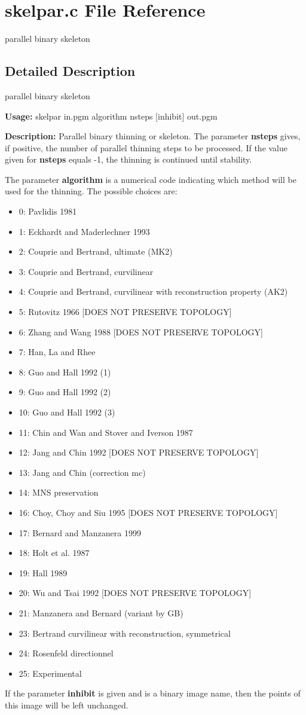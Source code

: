 \section{skelpar.c File Reference}
\label{skelpar_8c}
parallel binary skeleton 



\subsection{Detailed Description}
parallel binary skeleton 

{\bf Usage:} skelpar in.pgm algorithm nsteps [inhibit] out.pgm

{\bf Description:} Parallel binary thinning or skeleton. The parameter {\bf nsteps} gives, if positive, the number of parallel thinning steps to be processed. If the value given for {\bf nsteps} equals -1, the thinning is continued until stability.

The parameter {\bf algorithm} is a numerical code indicating which method will be used for the thinning. The possible choices are: \begin{itemize}
\item 0: Pavlidis 1981 \item 1: Eckhardt and Maderlechner 1993 \item 2: Couprie and Bertrand, ultimate (MK2) \item 3: Couprie and Bertrand, curvilinear \item 4: Couprie and Bertrand, curvilinear with reconstruction property (AK2) \item 5: Rutovitz 1966 [DOES NOT PRESERVE TOPOLOGY] \item 6: Zhang and Wang 1988 [DOES NOT PRESERVE TOPOLOGY] \item 7: Han, La and Rhee \item 8: Guo and Hall 1992 (1) \item 9: Guo and Hall 1992 (2) \item 10: Guo and Hall 1992 (3) \item 11: Chin and Wan and Stover and Iverson 1987 \item 12: Jang and Chin 1992 [DOES NOT PRESERVE TOPOLOGY] \item 13: Jang and Chin (correction mc) \item 14: MNS preservation \item 16: Choy, Choy and Siu 1995 [DOES NOT PRESERVE TOPOLOGY] \item 17: Bernard and Manzanera 1999 \item 18: Holt et al. 1987 \item 19: Hall 1989 \item 20: Wu and Tsai 1992 [DOES NOT PRESERVE TOPOLOGY] \item 21: Manzanera and Bernard (variant by GB) \item 23: Bertrand curvilinear with reconstruction, symmetrical \item 24: Rosenfeld directionnel \item 25: Experimental\end{itemize}
If the parameter {\bf inhibit} is given and is a binary image name, then the points of this image will be left unchanged.

